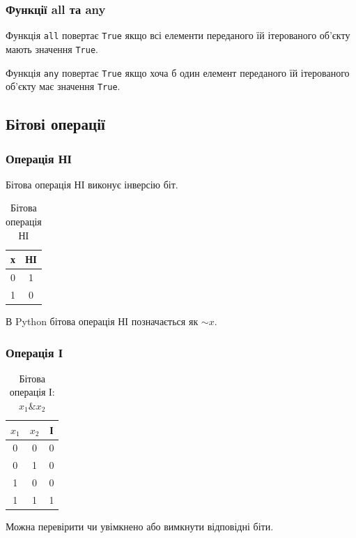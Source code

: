 \begin{frame}
\frametitle{Функції all та any}
Функція \texttt{all} повертає \texttt{True} якщо всі елементи переданого їй ітерованого об'єкту мають значення \texttt{True}.

Функція \texttt{any} повертає \texttt{True} якщо хоча б один елемент переданого їй ітерованого об'єкту має значення \texttt{True}.
\end{frame}

\subsection{Бітові операції} 
\begin{frame}
\frametitle{Операція НІ}
Бітова операція НІ виконує інверсію біт.

\begin{table}
  \caption{Бітова операція НІ}
  \label{tab:}

  \begin{center}
    \begin{tabular}{|c|c|}
    \hline
      \textbf{х} & \textbf{НІ} \\
    \hline
      0 & 1 \\
    \hline
      1 & 0 \\
    \hline
    \end{tabular}
  \end{center}
\end{table}

В Python бітова операція НІ позначається як $\sim x$.

\end{frame}

\begin{frame}
\frametitle{Операція І}

\begin{table}
  \caption{Бітова операція І: $x_1 \& x_2$}
  \label{tab:}

  \begin{center}
    \begin{tabular}{|c|c|c|}
    \hline
      \textbf{$x_1$} & \textbf{$x_2$} &  \textbf{І} \\
    \hline
      0 & 0 & 0 \\
    \hline
      0 & 1 & 0 \\
    \hline
      1 & 0 & 0 \\
    \hline
      1 & 1 & 1 \\
    \hline
    \end{tabular}
  \end{center}
\end{table}

Можна перевірити чи увімкнено або вимкнути відповідні біти.

\end{frame}

